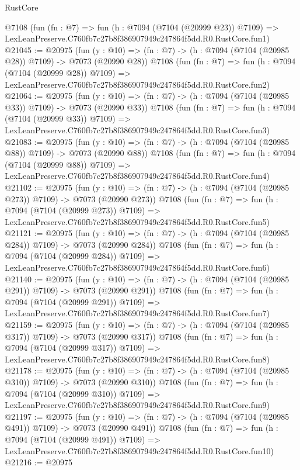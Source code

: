 \begin{lexlean}{RustCore}
\begin{coremodule}
    @7108
    (fun (fn : @7) =>
    fun (h : @7094 (@7104 (@20999 @23)) @7109) =>
    LexLeanPreserve.C760fb7c27b8f386907949c247864f5dd.R0.RustCore.fun1)
@21045 := @20975
    (fun (y : @10) => (fn : @7) -> (h : @7094 (@7104 (@20985 @28)) @7109) -> @7073 (@20990 @28))
    @7108
    (fun (fn : @7) =>
    fun (h : @7094 (@7104 (@20999 @28)) @7109) =>
    LexLeanPreserve.C760fb7c27b8f386907949c247864f5dd.R0.RustCore.fun2)
@21064 := @20975
    (fun (y : @10) => (fn : @7) -> (h : @7094 (@7104 (@20985 @33)) @7109) -> @7073 (@20990 @33))
    @7108
    (fun (fn : @7) =>
    fun (h : @7094 (@7104 (@20999 @33)) @7109) =>
    LexLeanPreserve.C760fb7c27b8f386907949c247864f5dd.R0.RustCore.fun3)
@21083 := @20975
    (fun (y : @10) => (fn : @7) -> (h : @7094 (@7104 (@20985 @88)) @7109) -> @7073 (@20990 @88))
    @7108
    (fun (fn : @7) =>
    fun (h : @7094 (@7104 (@20999 @88)) @7109) =>
    LexLeanPreserve.C760fb7c27b8f386907949c247864f5dd.R0.RustCore.fun4)
@21102 := @20975
    (fun (y : @10) => (fn : @7) -> (h : @7094 (@7104 (@20985 @273)) @7109) -> @7073 (@20990 @273))
    @7108
    (fun (fn : @7) =>
    fun (h : @7094 (@7104 (@20999 @273)) @7109) =>
    LexLeanPreserve.C760fb7c27b8f386907949c247864f5dd.R0.RustCore.fun5)
@21121 := @20975
    (fun (y : @10) => (fn : @7) -> (h : @7094 (@7104 (@20985 @284)) @7109) -> @7073 (@20990 @284))
    @7108
    (fun (fn : @7) =>
    fun (h : @7094 (@7104 (@20999 @284)) @7109) =>
    LexLeanPreserve.C760fb7c27b8f386907949c247864f5dd.R0.RustCore.fun6)
@21140 := @20975
    (fun (y : @10) => (fn : @7) -> (h : @7094 (@7104 (@20985 @291)) @7109) -> @7073 (@20990 @291))
    @7108
    (fun (fn : @7) =>
    fun (h : @7094 (@7104 (@20999 @291)) @7109) =>
    LexLeanPreserve.C760fb7c27b8f386907949c247864f5dd.R0.RustCore.fun7)
@21159 := @20975
    (fun (y : @10) => (fn : @7) -> (h : @7094 (@7104 (@20985 @317)) @7109) -> @7073 (@20990 @317))
    @7108
    (fun (fn : @7) =>
    fun (h : @7094 (@7104 (@20999 @317)) @7109) =>
    LexLeanPreserve.C760fb7c27b8f386907949c247864f5dd.R0.RustCore.fun8)
@21178 := @20975
    (fun (y : @10) => (fn : @7) -> (h : @7094 (@7104 (@20985 @310)) @7109) -> @7073 (@20990 @310))
    @7108
    (fun (fn : @7) =>
    fun (h : @7094 (@7104 (@20999 @310)) @7109) =>
    LexLeanPreserve.C760fb7c27b8f386907949c247864f5dd.R0.RustCore.fun9)
@21197 := @20975
    (fun (y : @10) => (fn : @7) -> (h : @7094 (@7104 (@20985 @491)) @7109) -> @7073 (@20990 @491))
    @7108
    (fun (fn : @7) =>
    fun (h : @7094 (@7104 (@20999 @491)) @7109) =>
    LexLeanPreserve.C760fb7c27b8f386907949c247864f5dd.R0.RustCore.fun10)
@21216 := @20975

\end{coremodule}
\end{lexlean}
